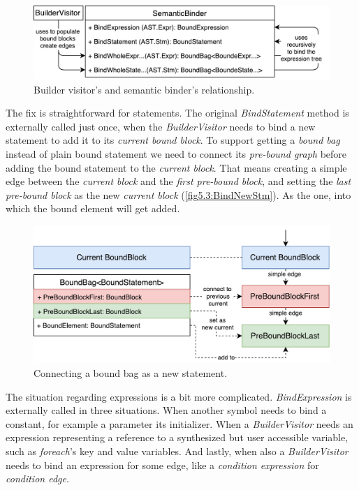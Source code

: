 \begin{figure}[h]
	\centering	
	\includegraphics[scale=0.75]{../img/5_3_BoundWholeExpression}	
	\caption{Builder visitor's and semantic binder's relationship.}
	\label{fig5.3:BindWholeExpr}
\end{figure}

The fix is straightforward for statements. The original \emph{BindStatement} method is externally called just once, when the \emph{BuilderVisitor} needs to bind a new statement to add it to its \emph{current bound block}. To support getting a \emph{bound bag} instead of plain bound statement we need to connect its \emph{pre-bound graph} before adding the bound statement to the \emph{current block}. That means creating a simple edge between the \emph{current block} and the \emph{first pre-bound block}, and setting the \emph{last pre-bound block} as the new \emph{current block} (\autoref{fig5.3:BindNewStm}). As the one, into which the bound element will get added.

\begin{figure}[h]
	\centering	
	\includegraphics[scale=0.75]{../img/5_3_newStatement}	
	\caption{Connecting a bound bag as a new statement.}
	\label{fig5.3:BindNewStm}
\end{figure}

The situation regarding expressions is a bit more complicated. \emph{BindExpression} is externally called in three situations. When another symbol needs to bind a constant, for example a parameter its initializer. When a \emph{BuilderVisitor} needs an expression representing a reference to a synthesized but user accessible variable, such as \emph{foreach}’s key and value variables. And lastly, when also a \emph{BuilderVisitor} needs to bind an expression for some edge, like a \emph{condition expression} for \emph{condition edge}.

